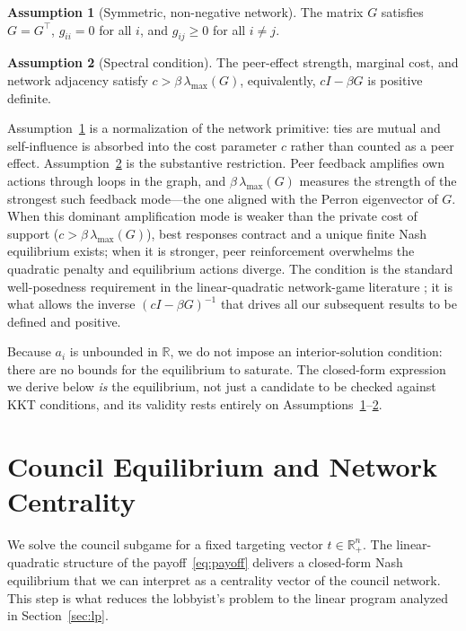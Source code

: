 \documentclass[11pt,letterpaper]{article}
\theoremstyle{plain}
\theoremstyle{definition}
\newtheorem{assumption}{Assumption}
\theoremstyle{remark}
\begin{document}
\begin{assumption}[Symmetric, non-negative network]\label{ass:R1}
The matrix $G$ satisfies $G = G^\top$, $g_{ii} = 0$ for all $i$, and $g_{ij} \geq 0$ for all $i \neq j$.
\end{assumption}

\begin{assumption}[Spectral condition]\label{ass:R2}
The peer-effect strength, marginal cost, and network adjacency satisfy $c > \beta\, \lambda_{\max}(G)$, equivalently, $cI - \beta G$ is positive definite.
\end{assumption}

Assumption~\ref{ass:R1} is a normalization of the network primitive: ties are mutual and self-influence is absorbed into the cost parameter $c$ rather than counted as a peer effect. Assumption~\ref{ass:R2} is the substantive restriction. Peer feedback amplifies own actions through loops in the graph, and $\beta\,\lambda_{\max}(G)$ measures the strength of the strongest such feedback mode---the one aligned with the Perron eigenvector of $G$. When this dominant amplification mode is weaker than the private cost of support ($c > \beta\, \lambda_{\max}(G)$), best responses contract and a unique finite Nash equilibrium exists; when it is stronger, peer reinforcement overwhelms the quadratic penalty and equilibrium actions diverge. The condition is the standard well-posedness requirement in the linear-quadratic network-game literature \citep{bcz2006, ggg2020}; it is what allows the inverse $(cI - \beta G)^{-1}$ that drives all our subsequent results to be defined and positive.

Because $a_i$ is unbounded in $\mathbb{R}$, we do not impose an interior-solution condition: there are no bounds for the equilibrium to saturate. The closed-form expression we derive below \emph{is} the equilibrium, not just a candidate to be checked against KKT conditions, and its validity rests entirely on Assumptions~\ref{ass:R1}--\ref{ass:R2}.


\section{Council Equilibrium and Network Centrality}
\label{sec:eq}

We solve the council subgame for a fixed targeting vector $t \in \mathbb{R}^n_+$. The linear-quadratic structure of the payoff~\eqref{eq:payoff} delivers a closed-form Nash equilibrium that we can interpret as a centrality vector of the council network. This step is what reduces the lobbyist's problem to the linear program analyzed in Section~\ref{sec:lp}.
\end{document}
